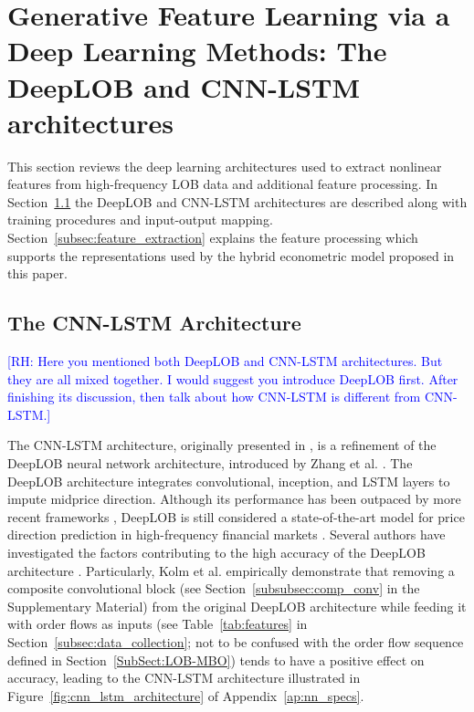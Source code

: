 \documentclass[10pt,a4paper,oneside]{article}
\newcommand{\rh}[1]{\textcolor{blue}{\textsf{[RH: #1]}}}
\begin{document}
\section{Generative Feature Learning via a Deep Learning Methods: The DeepLOB and CNN-LSTM architectures}
\label{Sect:Features}
This section reviews the deep learning architectures used to extract nonlinear features from high-frequency LOB data and additional feature processing. In Section~\ref{subsec:cnn_lstm} the DeepLOB \cite{zhang2021deeplearningmarketorder} and CNN-LSTM architectures \cite{kolm2023deep} are described along with training procedures and input-output mapping. Section~\ref{subsec:feature_extraction} explains the feature processing which supports the representations used by the hybrid econometric model proposed in this paper.
\subsection{The CNN-LSTM Architecture}
\label{subsec:cnn_lstm}
\rh{Here you mentioned both DeepLOB and CNN-LSTM architectures. But they are all mixed together. I would suggest you introduce DeepLOB first. After finishing its discussion, then talk about how CNN-LSTM is different from CNN-LSTM.}

The CNN-LSTM architecture, originally presented in \cite{kolm2023deep}, is a refinement of the DeepLOB neural network architecture, introduced by Zhang et al. \cite{Zhang_2019}. The DeepLOB architecture integrates convolutional, inception, and LSTM layers to impute midprice direction. Although its performance has been outpaced by more recent frameworks \cite{prata2024lob}, DeepLOB is still considered a state-of-the-art model for price direction prediction in high-frequency financial markets \cite{briola2024deep, kolm2023deep}. Several authors have investigated the factors contributing to the high accuracy of the DeepLOB architecture \cite{kolm2023deep, kolm2024improving, briola2024deep}. Particularly, Kolm et al. \cite{kolm2023deep} empirically demonstrate that removing a composite convolutional block (see Section~\ref{subsubsec:comp_conv} in the Supplementary Material) from the original DeepLOB architecture while feeding it with order flows as inputs (see Table~\ref{tab:features} in Section~\ref{subsec:data_collection}; not to be confused with the order flow sequence defined in Section~\ref{SubSect:LOB-MBO}) tends to have a positive effect on accuracy, leading to the CNN-LSTM architecture illustrated in Figure~\ref{fig:cnn_lstm_architecture} of Appendix~\ref{ap:nn_specs}.
\end{document}
